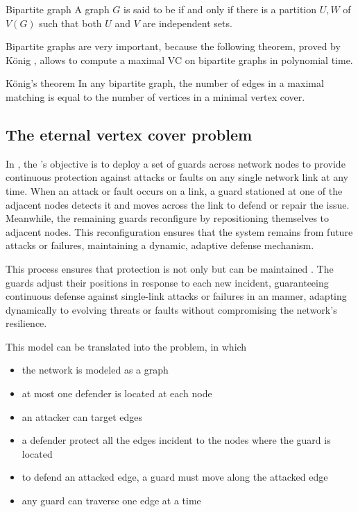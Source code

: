 \documentclass[a4paper, 12pt]{report}
\begin{document}
    \begin{frameddefn}{Bipartite graph}
        A graph $G$ is said to be  if and only if there is a partition $U, W$ of $V(G)$ such that both $U$ and $V$ are independent sets.
    \end{frameddefn}

    Bipartite graphs are very important, because the following theorem, proved by König \cite{konig}, allows to compute a maximal VC on bipartite graphs in polynomial time.

    \begin{framedthm}{König's theorem}
        In any bipartite graph, the number of edges in a maximal matching is equal to the number of vertices in a minimal vertex cover.
    \end{framedthm}

    \subsection{The eternal vertex cover problem}

    In , the 's objective is to deploy a  set of guards across network nodes to provide continuous protection against attacks or faults on any single network link at any time. When an attack or fault occurs on a link, a guard stationed at one of the adjacent nodes detects it and  moves across the link to defend or repair the issue. Meanwhile, the remaining guards reconfigure by repositioning themselves to adjacent nodes. This reconfiguration ensures that the system remains  from future attacks or failures, maintaining a dynamic, adaptive defense mechanism.

    This process ensures that protection is not only  but can be maintained . The guards adjust their positions in response to each new incident, guaranteeing continuous defense against single-link attacks or failures in an  manner, adapting dynamically to evolving threats or faults without compromising the network's resilience.

    This model can be translated into the  problem, in which

    \begin{itemize}
        \item the network is modeled as a graph
        \item at most one defender is located at each node
        \item an attacker can target edges
        \item a defender  protect all the edges incident to the nodes where the guard is located
        \item to defend an attacked edge, a guard must move along the attacked edge
        \item any guard can traverse one edge at a time
    \end{itemize}
\end{document}
